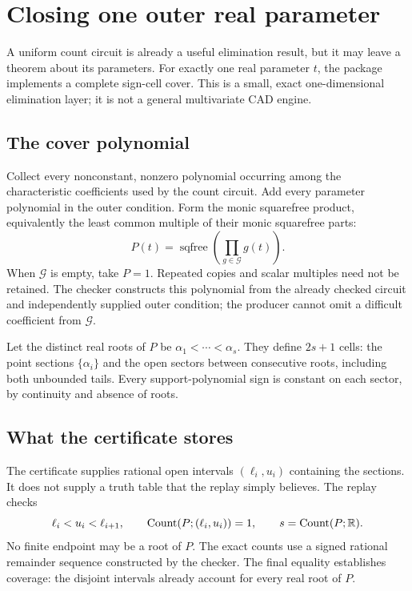 \section{Closing one outer real parameter}\label{sec:outer}

A uniform count circuit is already a useful elimination result, but it may leave a theorem about its parameters. For exactly one real parameter $t$, the package implements a complete sign-cell cover. This is a small, exact one-dimensional elimination layer; it is not a general multivariate CAD engine.

\subsection{The cover polynomial}

Collect every nonconstant, nonzero polynomial occurring among the characteristic coefficients used by the count circuit. Add every parameter polynomial in the outer condition. Form the monic squarefree product, equivalently the least common multiple of their monic squarefree parts:
\begin{equation}\label{eq:coverpoly}
P(t)=\operatorname{sqfree}\left(\prod_{g\in\mathcal G}g(t)\right).
\end{equation}
When $\mathcal G$ is empty, take $P=1$. Repeated copies and scalar multiples need not be retained. The checker constructs this polynomial from the already checked circuit and independently supplied outer condition; the producer cannot omit a difficult coefficient from $\mathcal G$.

Let the distinct real roots of $P$ be $\alpha_1<\cdots<\alpha_s$. They define $2s+1$ cells: the point sections $\{\alpha_i\}$ and the open sectors between consecutive roots, including both unbounded tails. Every support-polynomial sign is constant on each sector, by continuity and absence of roots.

\subsection{What the certificate stores}

The certificate supplies rational open intervals $(\ell_i,u_i)$ containing the sections. It does not supply a truth table that the replay simply believes. The replay checks
\[
\ell_i<u_i<\ell_{i+1},\qquad
\operatorname{Count}(P;(\ell_i,u_i))=1,
\qquad s=\operatorname{Count}(P;\mathbb R).
\]
No finite endpoint may be a root of $P$. The exact counts use a signed rational remainder sequence constructed by the checker. The final equality establishes coverage: the disjoint intervals already account for every real root of $P$.

